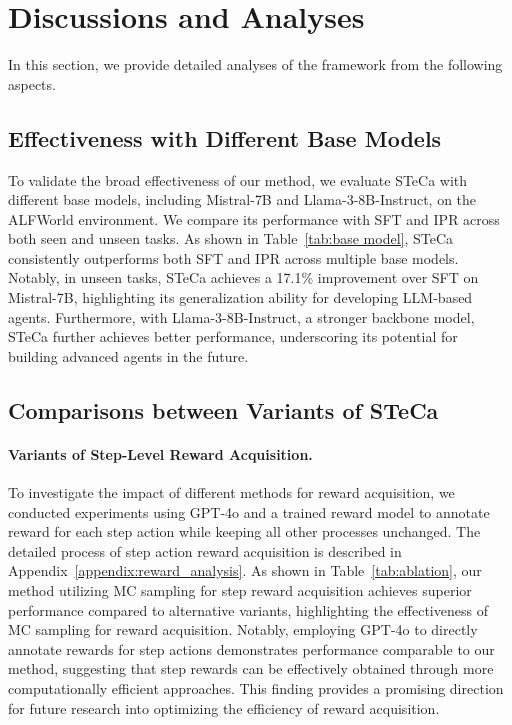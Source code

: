 \section{Discussions and Analyses}
In this section, we provide detailed analyses of the \model framework from the following aspects.

\subsection{Effectiveness with Different Base Models}

To validate the broad effectiveness of our method, we evaluate STeCa with different base models, including Mistral-7B and Llama-3-8B-Instruct, on the ALFWorld environment. We compare its performance with SFT and IPR across both seen and unseen tasks. As shown in Table~\ref{tab:base model}, STeCa consistently outperforms both SFT and IPR across multiple base models. 
Notably, in unseen tasks, STeCa achieves a 17.1\% improvement over SFT on Mistral-7B, highlighting its generalization ability for developing LLM-based agents. 
Furthermore, with Llama-3-8B-Instruct, a stronger backbone model, STeCa further achieves better performance, underscoring its potential for building advanced agents in the future.






\subsection{Comparisons between Variants of STeCa}
\label{analyses: ablation study}

\paragraph{Variants of Step-Level Reward Acquisition.}

To investigate the impact of different methods for reward acquisition, we conducted experiments using GPT-4o and a trained reward model to annotate reward for each step action while keeping all other processes unchanged. 
The detailed process of step action reward acquisition is described in Appendix~\ref{appendix:reward_analysis}. 
As shown in Table~\ref{tab:ablation}, our method utilizing MC sampling for step reward acquisition achieves superior performance compared to alternative variants, highlighting the effectiveness of MC sampling for reward acquisition. Notably, employing GPT-4o to directly annotate rewards for step actions demonstrates performance comparable to our method, suggesting that step rewards can be effectively obtained through more computationally efficient approaches. This finding provides a promising direction for future research into optimizing the efficiency of reward acquisition.



